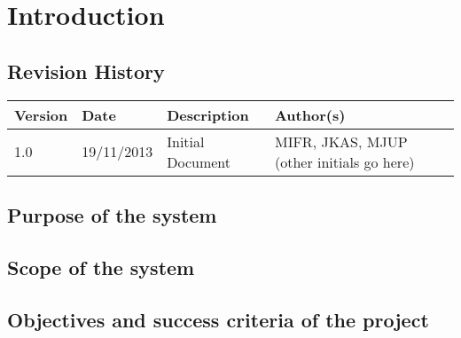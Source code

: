 \chapter{Introduction}
\label{sec:introduction}

\section{Revision History}
\begin{center}
    \begin{tabular}{ | l | l | p{6cm} | p{4cm} |}
    \hline
    Version & Date & Description & Author(s) \\ \hline
    1.0 & 19/11/2013 & Initial Document & MIFR, JKAS, MJUP (other initials go here)
    \\ \hline
    \end{tabular}
\end{center}

\section{Purpose of the system}


\section{Scope of the system}

\section{Objectives and success criteria of the project}
